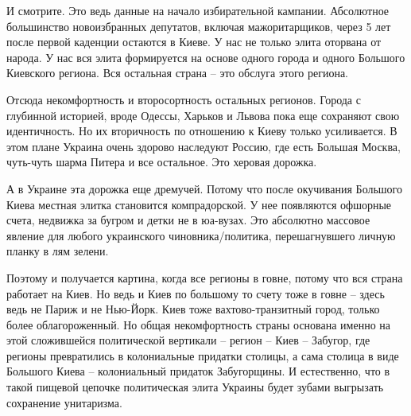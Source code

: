 И смотрите. Это ведь данные на начало избирательной кампании. Абсолютное
большинство новоизбранных депутатов, включая мажоритарщиков, через 5 лет после
первой каденции остаются в Киеве. У нас не только элита оторвана от народа. У
нас вся элита формируется на основе одного города и одного Большого Киевского
региона. Вся остальная страна – это обслуга этого региона.

Отсюда некомфортность и второсортность остальных регионов. Города с глубинной
историей, вроде Одессы, Харьков и Львова пока еще сохраняют свою идентичность.
Но их вторичность по отношению к Киеву только усиливается. В этом плане Украина
очень здорово наследуют Россию, где есть Большая Москва, чуть-чуть шарма Питера
и все остальное. Это херовая дорожка.

А в Украине эта дорожка еще дремучей. Потому что после окучивания Большого
Киева местная элитка становится компрадорской. У нее появляются офшорные счета,
недвижка за бугром и детки не в юа-вузах. Это абсолютно массовое явление для
любого украинского чиновника/политика, перешагнувшего личную планку в лям
зелени.

Поэтому и получается картина, когда все регионы в говне, потому что вся страна
работает на Киев. Но ведь и Киев по большому то счету тоже в говне – здесь ведь
не Париж и не Нью-Йорк. Киев тоже вахтово-транзитный город, только более
облагороженный. Но общая некомфортность страны основана именно на этой
сложившейся политической вертикали – регион – Киев – Забугор, где регионы
превратились в колониальные придатки столицы, а сама столица в виде Большого
Киева – колониальный придаток Забугорщины. И естественно, что в такой пищевой
цепочке политическая элита Украины будет зубами выгрызать сохранение
унитаризма.

